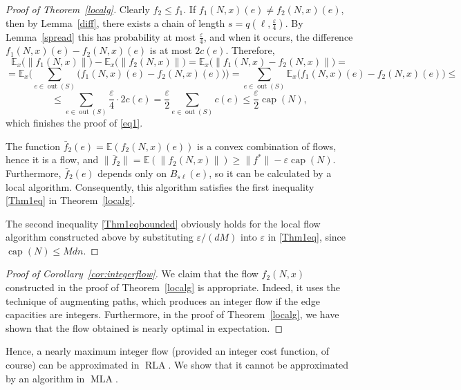 \documentclass[12pt,a4paper]{article}
\newcommand{\out}{\operatorname{out}}
\newcommand{\capp}{\operatorname{cap}}
\newcommand{\eps}{\varepsilon}
\newcommand{\E}{\mathbb{E}}
\renewcommand{\:}{\colon}
\DeclareMathOperator{\RLA}{RLA}
\DeclareMathOperator{\MLA}{MLA}
\begin{document}
\begin{proof}[Proof of Theorem~\ref{localg}]
Clearly $f_2\leq f_1$. 
If $f_1(N,x)(e) \neq f_2(N,x)(e)$, then by Lemma~\ref{diff}, there exists a chain of length $s=q(\ell, \frac{\eps}{4})$. 
By Lemma~\ref{spread} this has probability at most $\frac{\eps}{4}$, and when it occurs, the difference $f_1(N,x)(e) - f_2(N,x)(e)$ is at most $2c(e)$. Therefore,
\begin{equation*}
\E_x\big(\big\|f_1(N,x)\big\|\big) - \E_x\big(\big\|f_2(N,x)\big\|\big) = \E_x\big(\big\|f_1(N,x) - f_2(N,x)\big\|\big) =
\end{equation*}
\begin{equation*}
= \E_x\Big(\sum_{e \in \out(S)} \big(f_1(N,x)(e) - f_2(N,x)(e)\big)\Big) = \sum_{e \in \out(S)} \E_x\big(f_1(N,x)(e) - f_2(N,x)(e)\big) \le 
\end{equation*}
\begin{equation*}
\le \sum_{e \in \out(S)} \frac{\eps}{4} \cdot 2c(e) = \frac{\eps}{2} \sum_{e \in \out(S)}c(e) \le \frac{\eps}{2} \capp(N),
\end{equation*}
which finishes the proof of \eqref{eq1}.

The function $\bar{f}_2(e) = \E(f_2(N,x)(e))$ is a convex combination of flows, hence it is a flow, and $\big\|\bar{f}_2\big\| = \E(\big\|f_2(N,x)\big\|) \ge \big\|f^*\big\| - \eps \capp(N)$. 
Furthermore, $\bar{f}_2(e)$ depends only on $B_{s\ell}(e)$, so it can be calculated by a local algorithm. Consequently, this algorithm satisfies the first inequality \eqref{Thm1eq} in Theorem~\ref{localg}. 

The second inequality \eqref{Thm1eqbounded} obviously holds for the local flow algorithm constructed above by substituting $\eps/(dM)$ into $\eps$ in \eqref{Thm1eq}, since $\capp(N)\leq Mdn$.
\end{proof}

\begin{proof}[Proof of Corollary~\ref{cor:integerflow}]
We claim that the flow $f_2(N,x)$ constructed in the proof of Theorem~\ref{localg} is appropriate. 
Indeed, it uses the technique of augmenting paths, which produces an integer flow if the edge capacities are integers.
Furthermore, in the proof of Theorem~\ref{localg}, we have shown that the flow obtained is nearly optimal in expectation. 
\end{proof}

Hence, a nearly maximum integer flow (provided an integer cost function, of course) can be approximated in $\RLA$. 
We show that it cannot be approximated by an algorithm in $\MLA$. 
\end{document}
